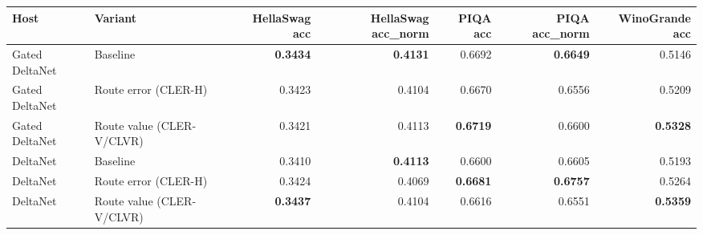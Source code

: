 \begin{tabular}{llrrrrr}
\toprule
Host & Variant & HellaSwag acc & HellaSwag acc\_norm & PIQA acc & PIQA acc\_norm & WinoGrande acc \\
\midrule
Gated DeltaNet & Baseline & \textbf{0.3434} & \textbf{0.4131} & 0.6692 & \textbf{0.6649} & 0.5146 \\
Gated DeltaNet & Route error (CLER-H) & 0.3423 & 0.4104 & 0.6670 & 0.6556 & 0.5209 \\
Gated DeltaNet & Route value (CLER-V/CLVR) & 0.3421 & 0.4113 & \textbf{0.6719} & 0.6600 & \textbf{0.5328} \\
\midrule
DeltaNet & Baseline & 0.3410 & \textbf{0.4113} & 0.6600 & 0.6605 & 0.5193 \\
DeltaNet & Route error (CLER-H) & 0.3424 & 0.4069 & \textbf{0.6681} & \textbf{0.6757} & 0.5264 \\
DeltaNet & Route value (CLER-V/CLVR) & \textbf{0.3437} & 0.4104 & 0.6616 & 0.6551 & \textbf{0.5359} \\
\bottomrule
\end{tabular}
